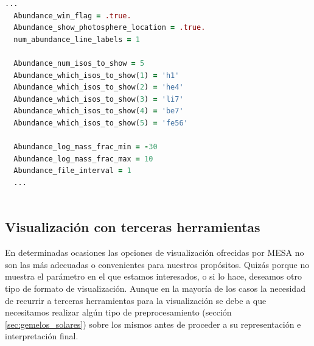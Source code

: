 \begin{lstlisting}[language=Fortran, float, caption={Ejemplo de configuración de la herramienta pgstart para la generación de una gráfica de abundacias de elementos químicos.}, label={lst:pg_star_config}]
  ...	
  Abundance_win_flag = .true.
  Abundance_show_photosphere_location = .true.
  num_abundance_line_labels = 1

  Abundance_num_isos_to_show = 5
  Abundance_which_isos_to_show(1) = 'h1'
  Abundance_which_isos_to_show(2) = 'he4'
  Abundance_which_isos_to_show(3) = 'li7'
  Abundance_which_isos_to_show(4) = 'be7'
  Abundance_which_isos_to_show(5) = 'fe56'
  
  Abundance_log_mass_frac_min = -30
  Abundance_log_mass_frac_max = 10
  Abundance_file_interval = 1
  ...
  
\end{lstlisting}


\subsection{Visualización con terceras herramientas}
En determinadas ocasiones las opciones de visualización ofrecidas por MESA no son las más adecuadas o convenientes para nuestros propósitos. Quizás porque no muestra el parámetro en el que estamos interesados, o si lo hace, deseamos otro tipo de formato de visualización. Aunque en la mayoría de los casos la necesidad de recurrir a terceras herramientas para la visualización se debe a que necesitamos realizar algún tipo de preprocesamiento (sección \ref{sec:gemelos_solares}) sobre los mismos antes de proceder a su representación e interpretación final.\par

